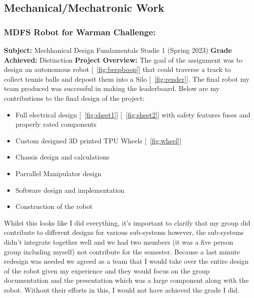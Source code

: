 \subsection{Mechanical/Mechatronic Work}

\subsubsection{MDFS Robot for Warman Challenge:}

\textbf{Subject: } Mechhanical Design Fundamentals Studie 1 (Spring 2023) \newline
\textbf{Grade Achieved: } Distinction \newline
\textbf{Project Overview: }
The goal of the assignment was to design an autonomous robot [~\ref{fig:beepboop}] that could traverse a track to collect tennis balls and deposit them into a Silo [~\ref{fig:render}]. The final robot my team produced was successful in making the leaderboard.
Below are my contributions to the final design of the project:

\begin{itemize} 
    \item Full electrical design [~\ref{fig:sheet1}] [~\ref{fig:sheet2}] with safety features fuses and properly rated components
    \item Custom designed 3D printed TPU Wheels [~\ref{fig:wheel}]
    \item Chassis design and calculations
    \item Parrallel Manipulator design 
    \item Software design and implementation
    \item Construction of the robot
\end{itemize}

Whilst this looks like I did everything, it's important to clarify that my group did contribute to different designs for various sub-systems however, the sub-systems didn't integrate together well and we had two members 
(it was a five person group including myself) not contribute for the semester. Because a last minute redesign
was needed we agreed as a team that I would take over the entire design of the robot given my experience and they would focus on the group documentation and the presentation which was a large component along with the robot. Without their efforts in this, I would
not have achieved the grade I did.

\newpage